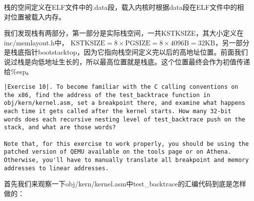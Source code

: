 \documentclass{article}
\newcommand{\funcname}[1]{{\ttfamily \small #1}}
\begin{document}
\begin{CJK*}{UTF8}{gkai}
栈的空间定义在ELF文件中的.data段，载入内核时根据data段在ELF文件中的相对位置被载入内存。

我们发现栈有两部分，第一部分是实际栈空间，一共KSTKSIZE，其大小定义在inc/memlayout.h中， $\mbox{KSTKSIZE} = 8 \times \mbox{PGSIZE} = 8 \times 4096\mbox{B} = 32\mbox{KB}$，另一部分是栈底指针bootstacktop，因为它指向栈空间定义完以后的高地址位置。前面我们说过栈是向低地址生长的，所以最高位置就是栈底。这个位置最终会作为初值传递给\%esp。

\vspace{4em}

\begin{lstlisting}[style=exercise]
|Exercise 10|. To become familiar with the C calling conventions on the x86, find the address of the test_backtrace function in obj/kern/kernel.asm, set a breakpoint there, and examine what happens each time it gets called after the kernel starts. How many 32-bit words does each recursive nesting level of test_backtrace push on the stack, and what are those words?

Note that, for this exercise to work properly, you should be using the patched version of QEMU available on the tools page or on Athena. Otherwise, you'll have to manually translate all breakpoint and memory addresses to linear addresses.
\end{lstlisting}

首先我们来观察一下obj/kern/kernel.asm中\funcname{test\_backtrace}的汇编代码到底是怎样做的：


\end{CJK*}
\end{document}
